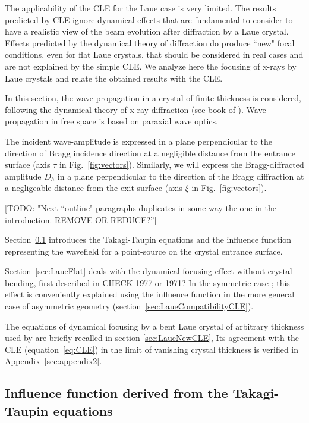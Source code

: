 \documentclass[preprint]{iucr}              %
\newcommand{\todo}[1]{{\color{red}[TODO: "#1'']}}
\newcommand{\inblue}[1]{{\color{blue}#1}}
\newcommand{\inred}[1]{{\color{red}#1}}
\begin{document}
\inblue{The applicability of the CLE for the Laue case is very limited. The results predicted by CLE ignore dynamical effects that are fundamental to consider to have a realistic view of the beam evolution after diffraction by a Laue crystal. Effects predicted by the dynamical theory of diffraction do produce ``new" focal conditions, even for flat Laue crystals, that should be considered in real cases and are not explained by the simple CLE. We analyze here the focusing of x-rays by Laue crystals and relate the obtained results with the CLE. }

In this section, the wave propagation in a crystal of finite thickness is considered, following the dynamical theory of x-ray diffraction (see book of \cite{authierbook}). Wave propagation in free space is based on paraxial wave optics.

The incident wave-amplitude is expressed in a plane perpendicular to the direction of \inred{\sout{Bragg}} incidence direction at a negligible distance from the entrance surface \inblue{(axis $\tau$ in Fig.~\ref{fig:vectors}).}
Similarly, we will express the Bragg-diffracted amplitude $D_h$ in a plane perpendicular to the direction of the Bragg diffraction at a negligeable distance from the exit surface \inblue{(axis $\xi$ in Fig.~\ref{fig:vectors}).}

\todo{Next ``outline" paragraphs duplicates in some way the one in the introduction. REMOVE OR REDUCE?}

\inred{Section~\ref{sec:influence} introduces the Takagi-Taupin equations and the influence function representing the wavefield for a point-source on the crystal entrance surface.

Section~\ref{sec:LaueFlat} deals with the dynamical focusing effect without crystal bending, first described in \cite{AfanasevKohn1977} CHECK 1977 or 1971? In the symmetric case \cite{kushnir}; \cite{GuigayFerrero2013} this effect is conveniently explained using the influence function in the more general case of asymmetric geometry (section~\ref{sec:LaueCompatibilityCLE}). 


The equations of dynamical focusing by a bent Laue crystal of arbitrary thickness used by \cite{GuigayFerrero2016} are briefly recalled in section \ref{sec:LaueNewCLE},  Its agreement with the CLE (equation~\ref{eq:CLE}) in the limit of vanishing crystal thickness is verified in Appendix~\ref{sec:appendix2}.
}
\subsection{Influence function derived from the Takagi-Taupin equations}
\label{sec:influence}
\end{document}
